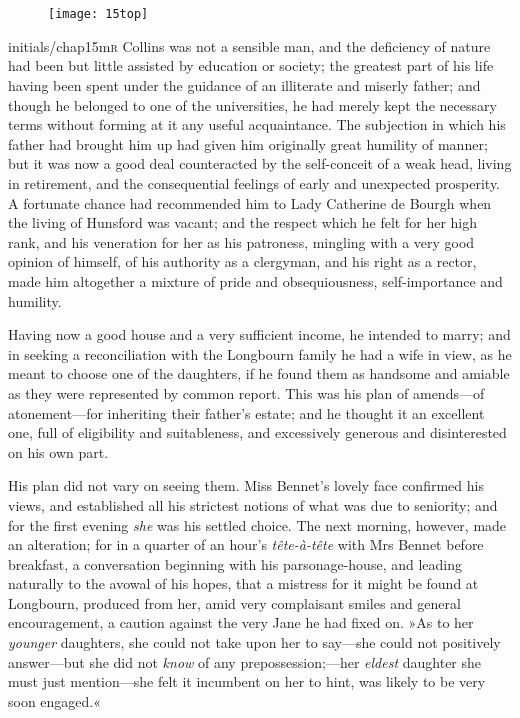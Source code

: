 \chapter[Chapter \thechapter]{}
\begin{figure}[t!]
\centering
\texttt{[image: 15top]}
\end{figure}

\lettrine[lines=6,image=true]{initials/chap15m}{r}  Collins was not a sensible man, and the deficiency of nature had been but little assisted by education or society; the greatest part of his life having been spent under the guidance of an illiterate and miserly father; and though he belonged to one of the universities, he had merely kept the necessary terms without forming at it any useful acquaintance. The subjection in which his father had brought him up had given him originally great humility of manner; but it was now a good deal counteracted by the self-conceit of a weak head, living in retirement, and the consequential feelings of early and unexpected prosperity. A fortunate chance had recommended him to Lady Catherine de Bourgh when the living of Hunsford was vacant; and the respect which he felt for her high rank, and his veneration for her as his patroness, mingling with a very good opinion of himself, of his authority as a clergyman, and his right as a rector, made him altogether a mixture of pride and obsequiousness, self-importance and humility.

Having now a good house and a very sufficient income, he intended to marry; and in seeking a reconciliation with the Longbourn family he had a wife in view, as he meant to choose one of the daughters, if he found them as handsome and amiable as they were represented by common report. This was his plan of amends—of atonement—for inheriting their father's estate; and he thought it an excellent one, full of eligibility and suitableness, and excessively generous and disinterested on his own part.

His plan did not vary on seeing them. Miss Bennet's lovely face confirmed his views, and established all his strictest notions of what was due to seniority; and for the first evening \textit{she} was his settled choice. The next morning, however, made an alteration; for in a quarter of an hour's \textit{tête-à-tête} with Mrs Bennet before breakfast, a conversation beginning with his parsonage-house, and leading naturally to the avowal of his hopes, that a mistress for it might be found at Longbourn, produced from her, amid very complaisant smiles and general encouragement, a caution against the very Jane he had fixed on. »As to her \textit{younger} daughters, she could not take upon her to say—she could not positively answer—but she did not \textit{know} of any prepossession;—her \textit{eldest} daughter she must just mention—she felt it incumbent on her to hint, was likely to be very soon engaged.«

